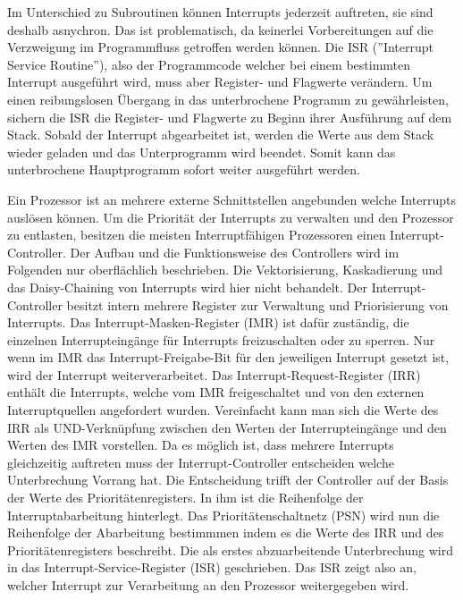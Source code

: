 \documentclass[12pt]{article}
\begin{document}
\noindent Im Unterschied zu Subroutinen können Interrupts jederzeit auftreten, sie sind deshalb asnychron. Das ist problematisch, da keinerlei Vorbereitungen auf die Verzweigung im Programmfluss getroffen werden können. Die ISR (''Interrupt Service Routine''), also der Programmcode welcher bei einem bestimmten Interrupt ausgeführt wird, muss aber Register- und Flagwerte verändern. Um einen reibungslosen Übergang in das unterbrochene Programm zu gewährleisten, sichern die ISR die Register- und Flagwerte zu Beginn ihrer Ausführung auf dem Stack. Sobald der Interrupt abgearbeitet ist, werden die Werte aus dem Stack wieder geladen und das Unterprogramm wird beendet. Somit kann das unterbrochene Hauptprogramm sofort weiter ausgeführt werden.
 
\par\bigskip\noindent Ein Prozessor ist an mehrere externe Schnittstellen angebunden welche Interrupts auslösen können. Um die Priorität der Interrupts zu verwalten und den Prozessor zu entlasten, besitzen die meisten Interruptfähigen Prozessoren einen Interrupt-Controller. Der Aufbau und die Funktionsweise des Controllers wird im Folgenden nur oberflächlich beschrieben. Die Vektorisierung, Kaskadierung und das Daisy-Chaining von Interrupts wird hier nicht behandelt.
Der Interrupt-Controller besitzt intern mehrere Register zur Verwaltung und Priorisierung von Interrupts. Das Interrupt-Masken-Register (IMR) ist dafür zuständig, die einzelnen Interrupteingänge für Interrupts freizuschalten oder zu sperren. Nur wenn im IMR das Interrupt-Freigabe-Bit für den jeweiligen Interrupt gesetzt ist, wird der Interrupt weiterverarbeitet. Das Interrupt-Request-Register (IRR) enthält die Interrupts, welche vom IMR freigeschaltet  und von den externen Interruptquellen angefordert wurden. Vereinfacht kann man sich die Werte des IRR als UND-Verknüpfung zwischen den Werten der Interrupteingänge und den Werten des IMR vorstellen. Da es möglich ist, dass mehrere Interrupts gleichzeitig auftreten muss der Interrupt-Controller entscheiden welche Unterbrechung Vorrang hat. Die Entscheidung trifft der Controller auf der Basis der Werte des Prioritätenregisters. In ihm ist die Reihenfolge der Interruptabarbeitung hinterlegt. Das Prioritätenschaltnetz (PSN) wird nun die Reihenfolge der Abarbeitung bestimmmen indem es die Werte des IRR und des Prioritätenregisters beschreibt. Die als erstes abzuarbeitende Unterbrechung wird in das Interrupt-Service-Register (ISR) geschrieben. Das ISR zeigt also an, welcher Interrupt zur Verarbeitung an den Prozessor weitergegeben wird. \cite[S.114ff]{mikroprozessortechnik2011}
\end{document}
